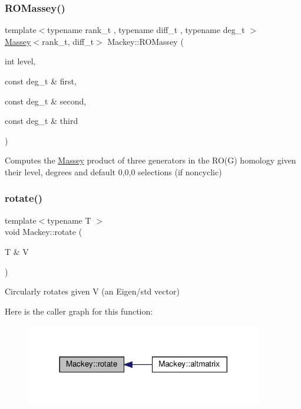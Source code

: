 \subsubsection{\texorpdfstring{R\+O\+Massey()}{ROMassey()}\hspace{0.1cm}{\footnotesize\ttfamily [2/2]}}
{\footnotesize\ttfamily template$<$typename rank\+\_\+t , typename diff\+\_\+t , typename deg\+\_\+t $>$ \\
\hyperlink{classMackey_1_1Massey}{Massey}$<$rank\+\_\+t, diff\+\_\+t$>$ Mackey\+::\+R\+O\+Massey (\begin{DoxyParamCaption}\item[{int}]{level,  }\item[{const deg\+\_\+t \&}]{first,  }\item[{const deg\+\_\+t \&}]{second,  }\item[{const deg\+\_\+t \&}]{third }\end{DoxyParamCaption})\hspace{0.3cm}{\ttfamily [inline]}}



Computes the \hyperlink{classMackey_1_1Massey}{Massey} product of three generators in the R\+O(\+G) homology given their level, degrees and default 0,0,0 selections (if noncyclic) 

\mbox{\label{namespaceMackey_a38a833de54971845cbdb8c96f830725b}} 
\subsubsection{\texorpdfstring{rotate()}{rotate()}}
{\footnotesize\ttfamily template$<$typename T $>$ \\
void Mackey\+::rotate (\begin{DoxyParamCaption}\item[{T \&}]{V }\end{DoxyParamCaption})}



Circularly rotates given V (an Eigen/std vector) 

Here is the caller graph for this function\+:\nopagebreak
\begin{figure}[H]
\begin{center}
\leavevmode
\includegraphics[width=293pt]{namespaceMackey_a38a833de54971845cbdb8c96f830725b_icgraph}
\end{center}
\end{figure}
\mbox{\label{namespaceMackey_a1824d780ce15f1845e4f87bf056feec9}} 
